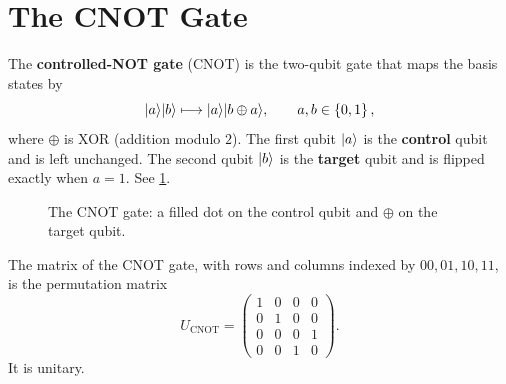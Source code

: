 \section{The CNOT Gate}

\begin{definition}\label{def:cnot-0915}
    The \textbf{controlled-NOT gate} (CNOT) is the two-qubit gate that maps the basis states by
    \[\lvert a \rangle \lvert b \rangle \longmapsto \lvert a \rangle \lvert b \oplus a \rangle, \qquad a, b \in \left\lbrace0,1\right\rbrace,\]
    where $\oplus$ is XOR (addition modulo $2$). The first qubit $\lvert a \rangle$ is the \textbf{control}
    qubit and is left unchanged. The second qubit $\lvert b \rangle$ is the \textbf{target} qubit and is flipped
    exactly when $a = 1$. See \cref{fig:cnot-0915}.
\end{definition}

\begin{figure}[ht]
    \centering
    \caption{The CNOT gate: a filled dot on the control qubit and $\oplus$ on the target qubit.}
    \label{fig:cnot-0915}
\end{figure}

\begin{lemma}\label{lem:cnot-0915}
    The matrix of the CNOT gate, with rows and columns indexed by $00, 01, 10, 11$, is the
    permutation matrix
    \[U_{\mathrm{CNOT}} = \begin{pmatrix}
            1 & 0 & 0 & 0 \\
            0 & 1 & 0 & 0 \\
            0 & 0 & 0 & 1 \\
            0 & 0 & 1 & 0
        \end{pmatrix}.\]
    It is unitary.
\end{lemma}

